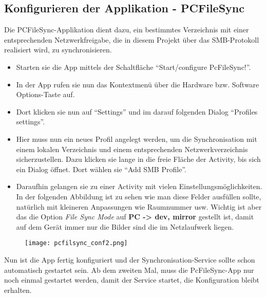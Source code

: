 \begin{flushleft}
  \subsection{Konfigurieren der Applikation - PCFileSync}\label{pcfilesync_subsec}
  Die PCFileSync-Applikation dient dazu, ein bestimmtes Verzeichnis mit einer entsprechenden Netzwerkfreigabe, die in diesem Projekt über das SMB-Protokoll realisiert wird, zu synchronisieren.
    \begin{itemize}
      \item Starten sie die App mittels der Schaltfläche ``Start/configure PcFileSync!''.
      \item In der App rufen sie nun das Kontextmenü über die Hardware bzw. Software Options-Taste auf.
      \item Dort klicken sie nun auf ``Settings'' und im darauf folgenden Dialog ``Profiles settings''.
      \item Hier muss nun ein neues Profil angelegt werden, um die Synchronisation mit einem lokalen Verzeichnis und einem entsprechenden Netzwerkverzeichnis sicherzustellen. Dazu klicken sie lange in die freie Fläche der Activity, bis sich ein Dialog öffnet. Dort wählen sie ``Add SMB Profile''.
      \item Daraufhin gelangen sie zu einer Activity mit vielen Einstellungsmöglichkeiten. In der folgenden Abbildung ist zu sehen wie man diese Felder ausfüllen sollte, natürlich mit kleineren Anpassungen wie Raumnummer usw. Wichtig ist aber das die Option \textit{File Sync Mode} auf \textbf{PC -> dev, mirror} gestellt ist, damit auf dem Gerät immer nur die Bilder sind die im Netzlaufwerk liegen.
      \end{itemize}
      \begin{figure}[htb]
        \centering
        \texttt{[image: pcfilsync\_conf2.png]}\\ %
      \end{figure}
      Nun ist die App fertig konfiguriert und der Synchronisation-Service sollte schon automatisch gestartet sein.
      Ab dem zweiten Mal, muss die PcFileSync-App nur noch einmal gestartet werden, damit der Service startet, die Konfiguration bleibt erhalten.    

\end{flushleft}
